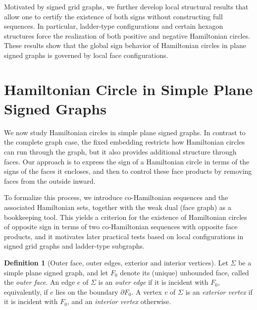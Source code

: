 \documentclass[12pt]{amsart}
\theoremstyle{theorem}%
\theoremstyle{definition}%
\newtheorem{definition}{Definition}
\begin{document}
Motivated by signed grid graphs, we further develop local structural results that allow one to certify the existence of both signs without constructing full sequences. In particular, ladder-type configurations and certain hexagon structures force the realization of both positive and negative Hamiltonian circles. These results show that the global sign behavior of Hamiltonian circles in plane signed graphs is governed by local face configurations.





\section{Hamiltonian Circle in  Simple Plane Signed Graphs}

We now study Hamiltonian circles in  simple plane signed graphs.  In contrast to the complete graph case, the
fixed embedding restricts how Hamiltonian circles can run through the graph, but it also provides additional
structure through faces.  Our approach is to express the sign of a Hamiltonian circle in terms of the signs of
the faces it encloses, and then to control these face products by removing faces from the outside inward.

To formalize this process, we introduce co-Hamiltonian sequences and the associated Hamiltonian sets, together
with the weak dual (face graph) as a bookkeeping tool.  This yields a criterion for the existence of Hamiltonian
circles of opposite sign in terms of two co-Hamiltonian sequences with opposite face products, and it motivates
later practical tests based on local configurations in signed grid graphs and ladder-type subgraphs.


\begin{definition}[Outer face, outer edges, exterior and interior vertices]
Let $\Sigma$ be a simple plane signed graph, and let $F_0$ denote its (unique) unbounded face, called the \emph{outer face}.
An edge $e$ of $\Sigma$ is an \emph{outer edge} if it is incident with $F_0$, equivalently, if $e$ lies on the boundary $\partial F_0$.
A vertex $v$ of $\Sigma$ is an \emph{exterior vertex} if it is incident with $F_0$, and an \emph{interior vertex} otherwise.
\end{definition}
\end{document}
